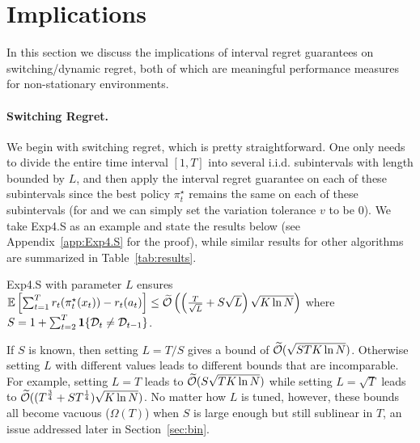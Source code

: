 \section{Implications}\label{sec:implications}
In this section we discuss the implications of interval regret
guarantees on switching/dynamic regret, both of which are
meaningful performance measures for non-stationary environments.

\paragraph{Switching Regret.} We begin with switching regret, which is pretty straightforward.
One only needs to divide the entire time interval $[1,T]$ into several i.i.d. subintervals with length bounded by $L$,
and then apply the interval regret guarantee on each of these subintervals since the best policy $\pi^\star_t$ remains the same on each of these subintervals
(for \AdaEG and \AdaILTCB we can simply set the variation tolerance $v$ to be $0$).
We take Exp4.S as an example and state the results below 
(see Appendix~\ref{app:Exp4.S} for the proof),
while similar results for other algorithms are summarized in Table~\ref{tab:results}.

\begin{cor}\label{cor:Exp4.S} 
Exp4.S with parameter $L$ ensures $\mathbb{E}\left[ \sum_{t=1}^T r_t(\pi_t^\star(x_t)) - r_t(a_t) \right] \leq 
\widetilde{\mathcal{O}}\left(\left(\frac{T}{\sqrt{L}} + S\sqrt{L}\right) \sqrt{K\ln N}\right)$ where $S = 1 + \sum_{t=2}^T \boldsymbol{1}\{{\mathcal{D}}_t \neq {\mathcal{D}}_{t-1}\}$.
\end{cor}


If $S$ is known, then setting $L = T/S$ gives a bound of $\widetilde{\mathcal{O}}(\sqrt{STK\ln N})$.
Otherwise setting $L$ with different values leads to different bounds that are incomparable.
For example, setting $L = T$ leads to $\widetilde{\mathcal{O}}(S\sqrt{TK\ln N})$ while setting 
$L = \sqrt{T}$ leads to $\widetilde{\mathcal{O}}((T^\frac{3}{4} + ST^\frac{1}{4})\sqrt{K\ln N})$.
No matter how $L$ is tuned, however,
these bounds all become vacuous ($\Omega(T)$) when $S$ is large enough but still sublinear in $T$,
an issue addressed later in Section~\ref{sec:bin}.

